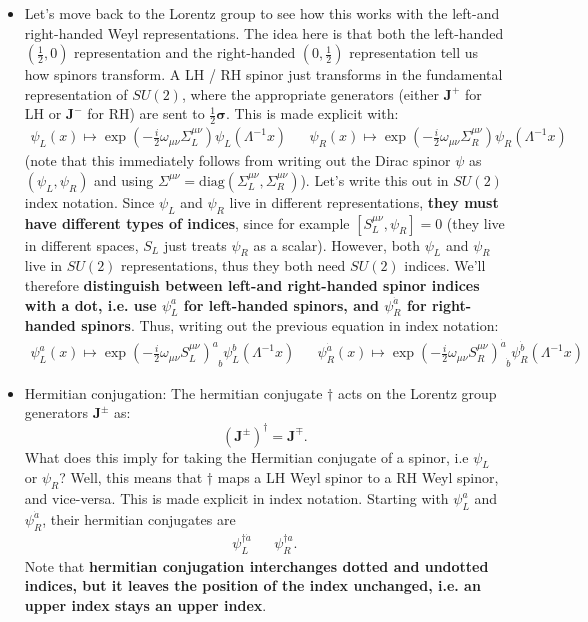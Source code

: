 \documentclass[12pt, oneside]{article}   	%
\theoremstyle{definition}
\begin{document}
\begin{itemize}
	\item Let's move back to the Lorentz group to see how this works with the left-and right-handed Weyl representations. The idea here is that both the left-handed $(\frac{1}{2}, 0)$ representation and the right-handed $(0, \frac{1}{2})$ representation tell us how spinors transform. A LH / RH spinor just transforms in the fundamental representation of $SU(2)$, where the appropriate generators (either $\bm J^+$ for LH or $\bm J^-$ for RH) are sent to $\frac{1}{2}\bm\sigma$. This is made explicit with:
	\begin{align}
	\psi_L(x)\mapsto \exp\left(-\frac{i}{2} \omega_{\mu\nu}\Sigma_L^{\mu\nu}\right) \psi_L(\Lambda^{-1}x) &&
	\psi_R(x)\mapsto \exp\left(-\frac{i}{2} \omega_{\mu\nu}\Sigma_R^{\mu\nu}\right) \psi_R(\Lambda^{-1}x)
	\end{align}
	(note that this immediately follows from writing out the Dirac spinor $\psi$ as $(\psi_L, \psi_R)$ and using $\Sigma^{\mu\nu} = \mathrm{diag}(\Sigma_L^{\mu\nu}, \Sigma_R^{\mu\nu})$). Let's write this out in $SU(2)$ index notation. Since $\psi_L$ and $\psi_R$ live in different representations, \textbf{they must have different types of indices}, since for example $[S_L^{\mu\nu}, \psi_R] = 0$ (they live in different spaces, $S_L$ just treats $\psi_R$ as a scalar). However, both $\psi_L$ and $\psi_R$ live in $SU(2)$ representations, thus they both need $SU(2)$ indices. We'll therefore \textbf{distinguish between left-and right-handed spinor indices with a dot, i.e. use $\psi_L^a$ for left-handed spinors, and $\psi_R^{\dot a}$ for right-handed spinors}. Thus, writing out the previous equation in index notation:
	\begin{align}
		\psi_L^a(x)\mapsto \exp\left(-\frac{i}{2} \omega_{\mu\nu}S_L^{\mu\nu}\right)^a_{\;\; b} \psi_L^b(\Lambda^{-1}x) &&
		\psi_R^{\dot a}(x)\mapsto \exp\left(-\frac{i}{2} \omega_{\mu\nu}S_R^{\mu\nu}\right)^{\dot a}_{\;\; \dot b} \psi_R^{\dot b}(\Lambda^{-1}x)
	\end{align}
	
	\item Hermitian conjugation: The hermitian conjugate $\dagger$ acts on the Lorentz group generators $\bm J^\pm$ as:
	\begin{equation}
		(\bm J^\pm)^\dagger = \bm J^\mp. 
	\end{equation}
	What does this imply for taking the Hermitian conjugate of a spinor, i.e $\psi_L$ or $\psi_R$? Well, this means that $\dagger$ maps a LH Weyl spinor to a RH Weyl spinor, and vice-versa. This is made explicit in index notation. Starting with $\psi_L^a$ and $\psi_R^{\dot a}$, their hermitian conjugates are 
	\begin{align}
		\psi_L^{\dagger \dot a} && \psi_R^{\dagger a}.
	\end{align}
	Note that \textbf{hermitian conjugation interchanges dotted and undotted indices, but it leaves the position of the index unchanged, i.e. an upper index stays an upper index}. 
	

\end{itemize}
\end{document}
